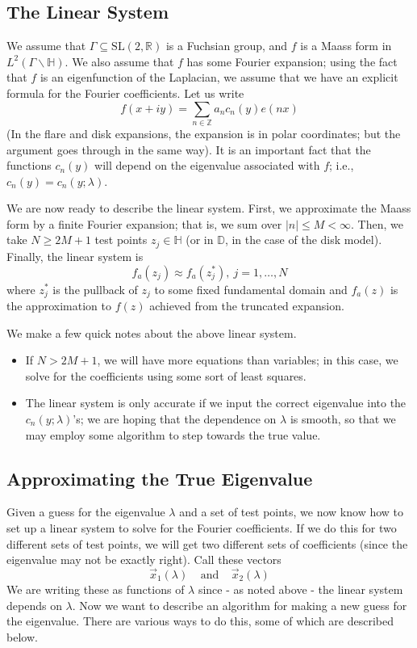 \documentclass[]{article}
\begin{document}
\subsection*{The Linear System}

We assume that $\Gamma \subseteq \text{SL}(2, \mathbb{R})$ is a Fuchsian group, and $f$ is a Maass form in $L^2(\Gamma\backslash\mathbb{H})$.
We also assume that $f$ has some Fourier expansion; using the fact that $f$ is an eigenfunction of the Laplacian, we assume that we have an explicit formula for the Fourier coefficients.
Let us write
$$
f(x + iy) = \sum_{n\in\mathbb{Z}}a_n c_n(y)e(nx)
$$
(In the flare and disk expansions, the expansion is in polar coordinates; but the argument goes through in the same way).
It is an important fact that the functions $c_n(y)$ will depend on the eigenvalue associated with $f$; i.e., $c_n(y) = c_n(y; \lambda)$.

We are now ready to describe the linear system.
First, we approximate the Maass form by a finite Fourier expansion; that is, we sum over $|n| \leq M < \infty$.
Then, we take $N \geq 2M + 1$ test points $z_j \in \mathbb{H}$ (or in $\mathbb{D}$, in the case of the disk model).
Finally, the linear system is
$$
f_a(z_j) \approx f_a(z_j^*), ~ j = 1, \dots, N
$$
where $z_j^*$ is the pullback of $z_j$ to some fixed fundamental domain and $f_a(z)$ is the approximation to $f(z)$ achieved from the truncated expansion.

We make a few quick notes about the above linear system.
\begin{itemize}
	\item If $N > 2M + 1$, we will have more equations than variables; in this case, we solve for the coefficients using some sort of least squares.
	\item The linear system is only accurate if we input the correct eigenvalue into the $c_n(y; \lambda)$'s; we are hoping that the dependence on $\lambda$ is smooth, so that we may employ some algorithm to step towards the true value.
\end{itemize}

\subsection*{Approximating the True Eigenvalue}

Given a guess for the eigenvalue $\lambda$ and a set of test points, we now know how to set up a linear system to solve for the Fourier coefficients.
If we do this for two different sets of test points, we will get two different sets of coefficients (since the eigenvalue may not be exactly right).
Call these vectors
$$
\vec{x}_1(\lambda) ~~~~~\text{and}~~~~~ \vec{x}_2(\lambda)
$$
We are writing these as functions of $\lambda$ since - as noted above - the linear system depends on $\lambda$.
Now we want to describe an algorithm for making a new guess for the eigenvalue.
There are various ways to do this, some of which are described below.
\end{document}
